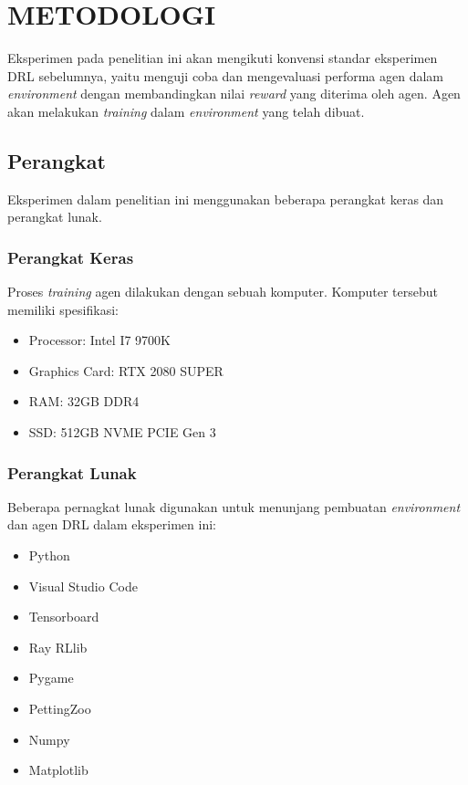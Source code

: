 \chapter{METODOLOGI}

Eksperimen pada penelitian ini akan mengikuti konvensi standar eksperimen DRL sebelumnya, yaitu menguji coba dan mengevaluasi performa agen dalam \emph{environment} dengan membandingkan nilai \emph{reward} yang diterima oleh agen.
Agen akan melakukan \emph{training} dalam \emph{environment} yang telah dibuat.

\section{Perangkat}

Eksperimen dalam penelitian ini menggunakan beberapa perangkat keras dan perangkat lunak.


\subsection{Perangkat Keras}

Proses \emph{training} agen dilakukan dengan sebuah komputer. Komputer tersebut memiliki spesifikasi:
\begin{itemize}
  \item Processor: Intel I7 9700K
  \item Graphics Card: RTX 2080 SUPER
  \item RAM: 32GB DDR4
  \item SSD: 512GB NVME PCIE Gen 3
\end{itemize}

\subsection{Perangkat Lunak}

Beberapa pernagkat lunak digunakan untuk menunjang pembuatan \emph{environment} dan agen DRL dalam eksperimen ini:
\begin{itemize}
  \item Python
  \item Visual Studio Code
  \item Tensorboard
  \item Ray RLlib
  \item Pygame
  \item PettingZoo
  \item Numpy
  \item Matplotlib
\end{itemize}
